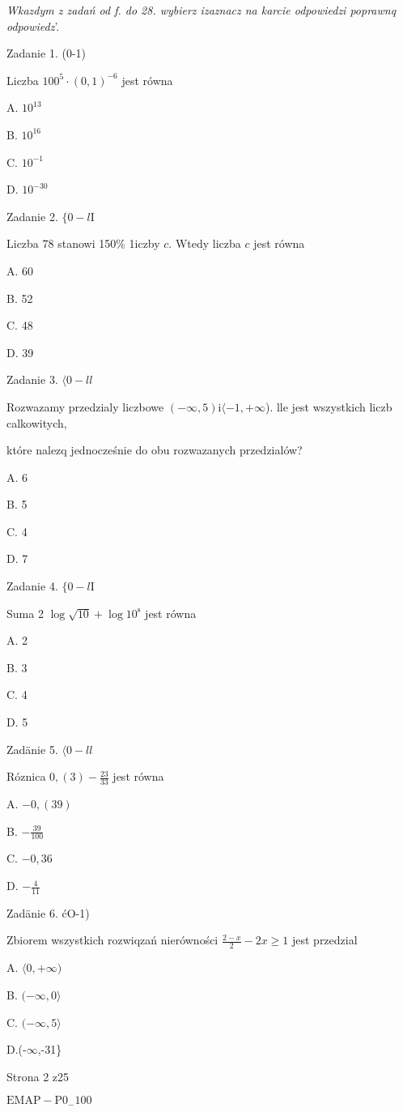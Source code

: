 \documentclass[a4paper,12pt]{article}
\begin{document}
{\it Wkazdym z zadań od f. do 28. wybierz izaznacz na karcie odpowiedzi poprawnq odpowiedz}'.

Zadanie 1. (0-1)

Liczba $100^{5}\cdot(0,1)^{-6}$ jest równa

A. $10^{13}$

B. $10^{16}$

C. $10^{-1}$

D. $10^{-30}$

Zadanie 2. $\{0-l\mathrm{I}$

Liczba 78 stanowi 150\% 1iczby $c$. Wtedy liczba $c$ jest równa

A. 60

B. 52

C. 48

D. 39

Zadanie 3. $\langle 0-ll$

Rozwazamy przedzialy liczbowe $(-\infty,5) \mathrm{i} \langle-1, +\infty$). lle jest wszystkich liczb calkowitych,

które nalezq jednocześnie do obu rozwazanych przedzialów?

A. 6

B. 5

C. 4

D. 7

Zadanie 4. $\{0-l\mathrm{I}$

Suma 2 $\log\sqrt{10}+\log 10^{\mathrm{s}}$ jest równa

A. 2

B. 3

C. 4

D. 5

Zadänie 5. $\langle 0-ll$

Róznica $0,(3)-\displaystyle \frac{23}{33}$ jest równa

A. $-0,(39)$

B. $-\displaystyle \frac{39}{100}$

C. $-0,36$

D. $-\displaystyle \frac{4}{11}$

Zadänie 6. ćO-1)

Zbiorem wszystkich rozwiqzań nierówności $\displaystyle \frac{2-x}{2}-2x\geq 1$ jest przedzial

A. $\langle 0, +\infty)$

B. $(-\infty,  0\rangle$

C. $(-\infty,  5\rangle$

D.(-$\infty$,-31\}

Strona 2 z25

$\mathrm{E}\mathrm{M}\mathrm{A}\mathrm{P}-\mathrm{P}0_{-}100$
\end{document}
